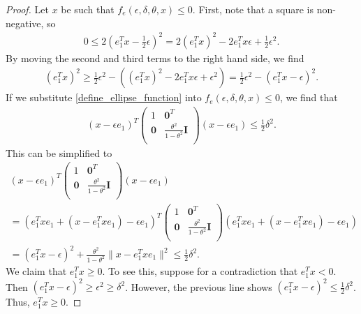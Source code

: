 \begin{proof}

Let $x$ be such that $f_e(\epsilon, \delta, \theta, x) \le 0$.
First, note that a square is non-negative, so
\begin{align*}
0 \le 2\left(e_1^Tx - \frac 1 2 \epsilon \right)^2
= 2\left(e_1^Tx\right)^2 - 2e_1^Tx\epsilon + \frac 1 2 \epsilon^2.
\end{align*}
By moving the second and third terms to the right hand side, we find
\begin{align}
\left(e_1^Tx\right)^2 \ge \frac 1 2 \epsilon^2 - \left(\left(e_1^Tx\right)^2 - 2e_1^Tx\epsilon + \epsilon^2\right) 
= \frac 1 2 \epsilon^2 - (e_1^Tx - \epsilon)^2. \label{ellipse_in_cone_eqn1}
\end{align}
If we substitute \cref{define_ellipse_function} into $f_e(\epsilon, \delta, \theta, x) \le 0$, we find that
\begin{align*}
(x - \epsilon e_1)^T\begin{pmatrix}
1 & \boldsymbol0^T \\
\boldsymbol 0 & \frac{\theta^2}{1 - \theta^2} \boldsymbol I \\
\end{pmatrix}(x - \epsilon e_1) \le \frac 1 2 \delta^2.
\end{align*}
This can be simplified to
\begin{align*}
(x - \epsilon e_1)^T\begin{pmatrix}
1 & \boldsymbol0^T \\
\boldsymbol 0 & \frac{\theta^2}{1 - \theta^2} \boldsymbol I \\
\end{pmatrix}(x - \epsilon e_1) \\
 = (e_1^Txe_1 + (x - e_1^Txe_1) - \epsilon e_1)^T\begin{pmatrix}
1 & \boldsymbol0^T \\
\boldsymbol 0 & \frac{\theta^2}{1 - \theta^2} \boldsymbol I \\
\end{pmatrix}(e_1^Txe_1 + (x - e_1^Txe_1) - \epsilon e_1)  \\
=
(e_1^Tx - \epsilon)^2 + \frac{\theta^2}{1 - \theta^2}\|x - e_1^Tx e_1\|^2 \le \frac 1 2 \delta^2.
\end{align*}
We claim that $e_1^Tx \ge 0$.   To see this, suppose for a contradiction that $e_1^Tx < 0$.  Then $(e_1^Tx - \epsilon)^2 \ge \epsilon^2 \ge \delta^2$.
However, the previous line shows $(e_1^Tx - \epsilon)^2 \le \frac 1 2 \delta^2$.
Thus, $e_1^Tx \ge 0$.


\end{proof}
